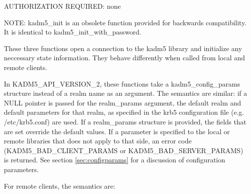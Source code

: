 AUTHORIZATION REQUIRED: none

NOTE: kadm5_init is an obsolete function provided for backwards
compatibility.  It is identical to kadm5_init_with_password.

These three functions open a connection to the kadm5 library and
initialize any neccessary state information.  They behave differently
when called from local and remote clients.  

In KADM5_API_VERSION_2, these functions take a kadm5_config_params
structure instead of a realm name as an argument.  The semantics are
similar: if a NULL pointer is passed for the realm_params argument,
the default realm and default parameters for that realm, as specified
in the krb5 configuration file (e.g. /etc/krb5.conf) are used.  If a
realm_params structure is provided, the fields that are set override
the default values.  If a parameter is specified to the local or
remote libraries that does not apply to that side, an error code
(KADM5_BAD_CLIENT_PARAMS or KADM5_BAD_SERVER_PARAMS) is returned.  See
section \ref{sec:configparams} for a discussion of configuration
parameters.

For remote clients, the semantics are:

